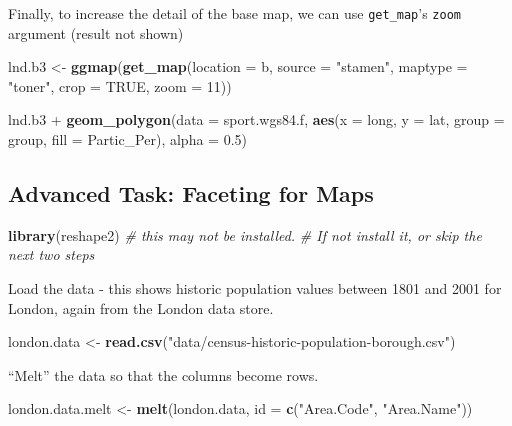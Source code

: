 \documentclass[]{article}
\newenvironment{Shaded}{}{}
\newcommand{\KeywordTok}[1]{\textcolor[rgb]{0.00,0.44,0.13}{\textbf{{#1}}}}
\newcommand{\DataTypeTok}[1]{\textcolor[rgb]{0.56,0.13,0.00}{{#1}}}
\newcommand{\DecValTok}[1]{\textcolor[rgb]{0.25,0.63,0.44}{{#1}}}
\newcommand{\FloatTok}[1]{\textcolor[rgb]{0.25,0.63,0.44}{{#1}}}
\newcommand{\StringTok}[1]{\textcolor[rgb]{0.25,0.44,0.63}{{#1}}}
\newcommand{\CommentTok}[1]{\textcolor[rgb]{0.38,0.63,0.69}{\textit{{#1}}}}
\newcommand{\OtherTok}[1]{\textcolor[rgb]{0.00,0.44,0.13}{{#1}}}
\newcommand{\NormalTok}[1]{{#1}}
\begin{document}
Finally, to increase the detail of the base map, we can use
\texttt{get\_map}'s \texttt{zoom} argument (result not shown)

\begin{Shaded}
\begin{Highlighting}[]
\NormalTok{lnd.b3 <-}\StringTok{ }\KeywordTok{ggmap}\NormalTok{(}\KeywordTok{get_map}\NormalTok{(}\DataTypeTok{location =} \NormalTok{b, }\DataTypeTok{source =} \StringTok{"stamen"}\NormalTok{, }\DataTypeTok{maptype =} \StringTok{"toner"}\NormalTok{, }
    \DataTypeTok{crop =} \OtherTok{TRUE}\NormalTok{, }\DataTypeTok{zoom =} \DecValTok{11}\NormalTok{))}

\NormalTok{lnd.b3 +}\StringTok{ }\KeywordTok{geom_polygon}\NormalTok{(}\DataTypeTok{data =} \NormalTok{sport.wgs84.f, }\KeywordTok{aes}\NormalTok{(}\DataTypeTok{x =} \NormalTok{long, }\DataTypeTok{y =} \NormalTok{lat, }\DataTypeTok{group =} \NormalTok{group, }
    \DataTypeTok{fill =} \NormalTok{Partic_Per), }\DataTypeTok{alpha =} \FloatTok{0.5}\NormalTok{)}
\end{Highlighting}
\end{Shaded}

\subsection{Advanced Task: Faceting for
Maps}\label{advanced-task-faceting-for-maps}

\begin{Shaded}
\begin{Highlighting}[]
\KeywordTok{library}\NormalTok{(reshape2)  }\CommentTok{# this may not be installed. }
\CommentTok{# If not install it, or skip the next two steps}
\end{Highlighting}
\end{Shaded}

Load the data - this shows historic population values between 1801 and
2001 for London, again from the London data store.

\begin{Shaded}
\begin{Highlighting}[]
\NormalTok{london.data <-}\StringTok{ }\KeywordTok{read.csv}\NormalTok{(}\StringTok{"data/census-historic-population-borough.csv"}\NormalTok{)}
\end{Highlighting}
\end{Shaded}

``Melt'' the data so that the columns become rows.

\begin{Shaded}
\begin{Highlighting}[]
\NormalTok{london.data.melt <-}\StringTok{ }\KeywordTok{melt}\NormalTok{(london.data, }\DataTypeTok{id =} \KeywordTok{c}\NormalTok{(}\StringTok{"Area.Code"}\NormalTok{, }\StringTok{"Area.Name"}\NormalTok{))}
\end{Highlighting}
\end{Shaded}
\end{document}
